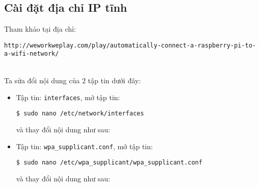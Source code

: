 \subsection{Cài đặt địa chỉ IP tĩnh}
Tham khảo tại địa chỉ: 

\begin{footnotesize}
\verb|http://weworkweplay.com/play/automatically-connect-a-raspberry-pi-to-a-wifi-network/|
\end{footnotesize}\\

Ta sửa đổi nội dung của 2 tập tin dưới đây:
\begin{itemize}
\item Tập tin: \verb|interfaces|, mở tập tin:
\begin{lstlisting}[language=bash]
$ sudo nano /etc/network/interfaces
\end{lstlisting}
và thay đổi nội dung như sau:

\item Tập tin: \verb|wpa_supplicant.conf|,  mở tập tin:
\begin{lstlisting}[language=bash]
$ sudo nano /etc/wpa_supplicant/wpa_supplicant.conf
\end{lstlisting}
và thay đổi nội dung như sau:

\end{itemize}
